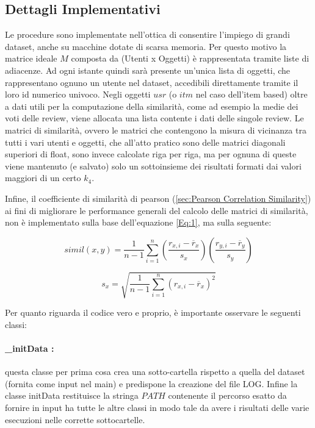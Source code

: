 \documentclass[12pt]{article}
\begin{document}
\subsection{Dettagli Implementativi}
Le procedure sono implementate nell'ottica di consentire l'impiego di grandi dataset, anche su macchine dotate di scarsa memoria. Per questo motivo la matrice ideale $M$ composta da (Utenti x Oggetti) è rappresentata tramite liste di adiacenze. Ad ogni istante quindi sarà presente un'unica lista di oggetti, che rappresentano ognuno un utente nel dataset, accedibili direttamente tramite il loro id numerico univoco. Negli oggetti $usr$ (o $itm$ nel caso dell'item based) oltre a dati utili per la computazione della similarità, come ad esempio la medie dei voti delle review, viene allocata una lista contente i dati delle singole review.
Le matrici di similarità, ovvero le matrici che contengono la misura di vicinanza tra tutti i vari utenti e oggetti, che all'atto pratico sono delle matrici diagonali superiori di float, sono invece calcolate riga per riga, ma per ognuna di queste viene mantenuto (e salvato) solo un sottoinsieme dei risultati formati dai valori maggiori di un certo $k_4$.

Infine,  il coefficiente di similarità di pearson (\ref{sec:Pearson Correlation Similarity}) ai fini di migliorare le performance generali del calcolo delle matrici di similarità, non è implementato sulla base dell'equazione \ref{Eq:1}, ma sulla seguente:

\begin{equation}
simil(x,y) = \frac{1}{n-1}\sum_{i=1}^{n}(\frac{r_{x,i}-\overline{r}_x}{s_x})(\frac{r_{y,i}-\overline{r}_y}{s_y})
\end{equation}



\begin{equation}
s_x = \sqrt{\frac{1}{n-1}\sum_{i=1}^{n}(r_{x,i}-\overline{r}_x)^2}
\label{Eq:3}
\end{equation}



Per quanto riguarda il codice vero e proprio, è importante osservare le seguenti classi:
\paragraph{\_initData :} questa classe per prima cosa crea una sotto-cartella rispetto a quella del dataset (fornita come input nel main) e predispone la creazione del file LOG. Infine la classe initData restituisce la stringa $PATH$ contenente il percorso esatto da fornire in input ha tutte le altre classi in modo tale da avere i risultati delle varie esecuzioni nelle corrette sottocartelle.
\end{document}
